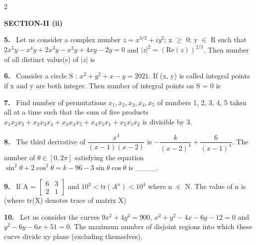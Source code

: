 \documentclass[10pt]{extarticle}
\newcommand{\sect}[1]{\par\smallskip\noindent\textbf{#1}\par}
\newcommand{\qn}[1]{\par\smallskip\noindent\textbf{#1.}~}
\begin{document}
\begin{multicols}{2}
\sect{SECTION-II (ii)}
\qn{5} Let us consider a complex number $z=x^{3/2}+iy^2$; x $\geqslant$ 0; y $\in$ R such that $2x^5y-x^4y+2x^3y-x^2y+4xy-2y=0$ and $|z|^2=(\text{Re}(z))^{2/3}$. Then number of all distinct value(s) of $|z|$ is
\qn{6} Consider a circle S : $x^2+y^2+x-y=2021$. If (x, y) is called integral points if x and y are both integer. Then number of integral points on S = 0 is
\qn{7} Find number of permutations $x_1,x_2,x_3,x_4,x_5$ of numbers 1, 2, 3, 4, 5 taken all at a time such that the sum of five products $x_1x_2x_3+x_2x_3x_4+x_3x_4x_5+x_4x_5x_1+x_5x_1x_2$ is divisible by 3.
\qn{8} The third derivative of $\dfrac{x^4}{(x-1)(x-2)}$ is $-\dfrac{k}{(x-2)^4}+\dfrac{6}{(x-1)^4}$. The number of $\theta\in[0,2\pi]$ satisfying the equation $\sin^2\theta+2\cos^2\theta=k-96-3\sin\theta\cos\theta$ is \_\_\_\_.
\qn{9} If A = $\begin{bmatrix}6&3\\2&1\end{bmatrix}$ and $10^3<\text{tr}(A^n)<10^4$ where n $\in$ N. The value of n is (where tr(X) denotes trace of matrix X)
\qn{10} Let us consider the curves $9x^2+4y^2=900$, $x^2+y^2-4x-6y-12=0$ and $y^2-6y-6x+51=0$. The maximum number of disjoint regions into which these curve divide xy plane (excluding themselves).
\end{multicols}
\end{document}
